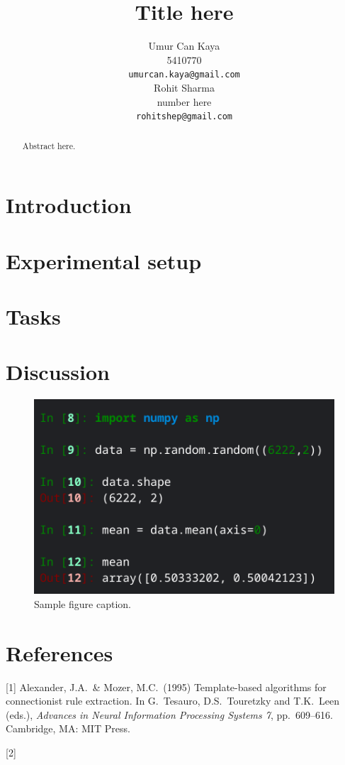 \documentclass{article}
\title{Title here}
\author{
Umur Can Kaya\\
5410770\\
\texttt{umurcan.kaya@gmail.com}\\
\And
Rohit Sharma\\
number here\\
\texttt{rohitshep@gmail.com}\\
}
\begin{document}
\maketitle

\begin{abstract}
Abstract here.
\end{abstract}

\section{Introduction}

\section{Experimental setup}
\section{Tasks}
\section{Discussion}

\begin{figure}[h!]
\centering
\includegraphics[width=1\linewidth]{LAB/ex.png}
\caption{Sample figure caption.}
\end{figure}




\section*{References}

[1] Alexander, J.A.\ \& Mozer, M.C.\ (1995) Template-based algorithms for
connectionist rule extraction. In G.\ Tesauro, D.S.\ Touretzky and T.K.\ Leen
(eds.), {\it Advances in Neural Information Processing Systems 7},
pp.\ 609--616. Cambridge, MA: MIT Press.

[2]
\end{document}
